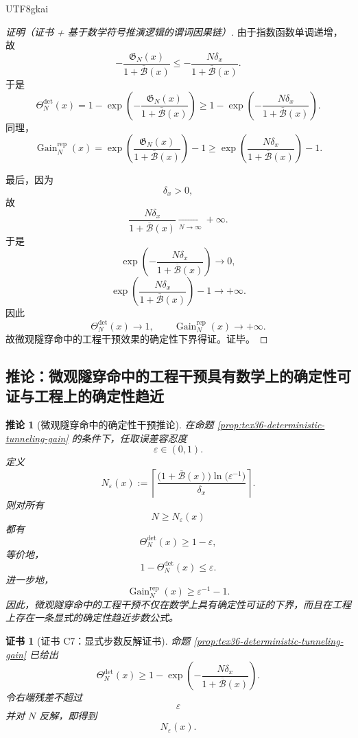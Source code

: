 \documentclass[12pt]{article}
\newtheorem{corollary}{推论}[section]
\newtheorem{Certificate}{证书}[section]
\begin{document}
\begin{CJK*}{UTF8}{gkai}
\begin{proof}[证明（证书 + 基于数学符号推演逻辑的谓词因果链）]
由于指数函数单调递增，故
\[
  -\frac{\mathfrak G_N(x)}{1+\overline{\mathcal B}(x)}
  \le
  -\frac{N\delta_x}{1+\overline{\mathcal B}(x)}.
\]
于是
\[
  \Theta_N^{\mathrm{det}}(x)
  =
  1-\exp\left(
    -\frac{\mathfrak G_N(x)}{1+\overline{\mathcal B}(x)}
  \right)
  \ge
  1-\exp\left(
    -\frac{N\delta_x}{1+\overline{\mathcal B}(x)}
  \right).
\]
同理，
\[
  \operatorname{Gain}_N^{\mathrm{rep}}(x)
  =
  \exp\left(
    \frac{\mathfrak G_N(x)}{1+\overline{\mathcal B}(x)}
  \right)-1
  \ge
  \exp\left(
    \frac{N\delta_x}{1+\overline{\mathcal B}(x)}
  \right)-1.
\]

最后，因为
\[
  \delta_x>0,
\]
故
\[
  \frac{N\delta_x}{1+\overline{\mathcal B}(x)}
  \xrightarrow[N\to\infty]{}+\infty.
\]
于是
\[
  \exp\left(
    -\frac{N\delta_x}{1+\overline{\mathcal B}(x)}
  \right)\to 0,
\]
\[
  \exp\left(
    \frac{N\delta_x}{1+\overline{\mathcal B}(x)}
  \right)-1\to +\infty.
\]
因此
\[
  \Theta_N^{\mathrm{det}}(x)\to 1,
  \qquad
  \operatorname{Gain}_N^{\mathrm{rep}}(x)\to +\infty.
\]
故微观隧穿命中的工程干预效果的确定性下界得证。证毕。
\end{proof}

\subsection{推论：微观隧穿命中的工程干预具有数学上的确定性可证与工程上的确定性趋近}
\label{subsec:tex36-deterministic-approximation}

\begin{corollary}[微观隧穿命中的确定性干预推论]
\label{cor:tex36-deterministic-approximation}
在命题 \ref{prop:tex36-deterministic-tunneling-gain} 的条件下，任取误差容忍度
\[
  \varepsilon\in(0,1).
\]
定义
\[
  N_\varepsilon(x)
  :=
  \left\lceil
    \frac{
      \bigl(1+\overline{\mathcal B}(x)\bigr)\ln\!\bigl(\varepsilon^{-1}\bigr)
    }{
      \delta_x
    }
  \right\rceil.
\]
则对所有
\[
  N\ge N_\varepsilon(x)
\]
都有
\[
  \Theta_N^{\mathrm{det}}(x)\ge 1-\varepsilon,
\]
等价地，
\[
  1-\Theta_N^{\mathrm{det}}(x)\le \varepsilon.
\]
进一步地，
\[
  \operatorname{Gain}_N^{\mathrm{rep}}(x)\ge \varepsilon^{-1}-1.
\]
因此，微观隧穿命中的工程干预不仅在数学上具有确定性可证的下界，而且在工程上存在一条显式的确定性趋近步数公式。
\end{corollary}

\begin{Certificate}[证书 C7：显式步数反解证书]
\label{cert:tex36-c7}
命题 \ref{prop:tex36-deterministic-tunneling-gain} 已给出
\[
  \Theta_N^{\mathrm{det}}(x)
  \ge
  1-\exp\left(
    -\frac{N\delta_x}{1+\overline{\mathcal B}(x)}
  \right).
\]
令右端残差不超过
\[
  \varepsilon
\]
并对 $N$ 反解，即得到
\[
  N_\varepsilon(x).
\]
\end{Certificate}


\end{CJK*}
\end{document}
